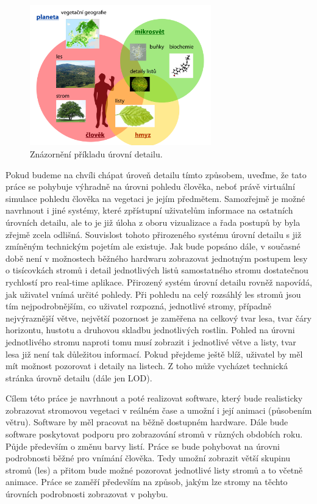 \begin{figure}[!hbt]
\begin{center}
\includegraphics[width=0.7\textwidth]{./figures/DETAIL.png}

\caption{Znázornění příkladu úrovní detailu. }
\label{fig:Levels_of_detail}
\end{center}
\end{figure}

Pokud budeme na chvíli chápat úroveň detailu tímto způsobem, uveďme, že tato práce se pohybuje výhradně na úrovni pohledu člověka, neboť právě virtuální simulace pohledu člověka na vegetaci je jejím předmětem.
Samozřejmě je možné navrhnout i jiné systémy, které zpřístupní uživatelům informace na ostatních úrovních detailu, ale to je již úloha z oboru vizualizace a řada postupů by byla zřejmě zcela odlišná.
Souvislost tohoto přirozeného systému úrovní detailu s již zmíněným technickým pojetím ale existuje. Jak bude popsáno dále, v současné době není v možnostech běžného hardwaru zobrazovat jednotným postupem lesy o tisícovkách stromů i detail jednotlivých listů samostatného stromu dostatečnou rychlostí pro real-time aplikace. Přirozený systém úrovní detailu rovněž napovídá, jak uživatel vnímá určité pohledy. Při pohledu na celý rozsáhlý les stromů jsou tím nejpodrobnějším, co uživatel rozpozná, jednotlivé stromy, případně nejvýraznější větve, největší pozornost je zaměřena na celkový tvar lesa, tvar čáry horizontu, hustotu a druhovou skladbu jednotlivých rostlin. Pohled na úrovni jednotlivého stromu naproti tomu musí zobrazit i jednotlivé větve a listy, tvar lesa již není tak důležitou informací. Pokud přejdeme ještě blíž, uživatel by měl mít možnost pozorovat i detaily na listech. Z toho může vycházet technická stránka úrovně detailu (dále jen LOD).

Cílem této práce je navrhnout a poté realizovat software, který bude realisticky zobrazovat stromovou vegetaci v reálném čase a umožní i její animaci (působením větru). Software by měl pracovat na běžně dostupném hardware. Dále bude software poskytovat podporu pro zobrazování stromů v různých obdobích roku. Půjde především o změnu barvy listí. Práce se bude pohybovat na úrovni podrobnosti běžné pro vnímání člověka. Tedy umožní zobrazit větší skupinu stromů (les) a přitom bude možné pozorovat jednotlivé listy stromů a to včetně animace. Práce se zaměří především na způsob, jakým lze stromy na těchto úrovních podrobnosti zobrazovat v pohybu.

